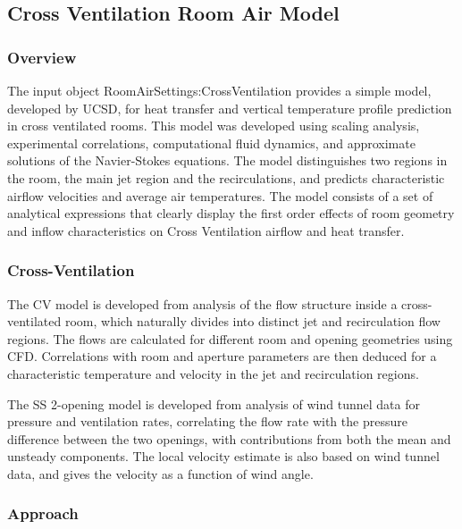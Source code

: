 \subsection{Cross Ventilation Room Air Model}\label{cross-ventilation-room-air-model}

\subsubsection{Overview}\label{overview-3-001}

The input object RoomAirSettings:CrossVentilation provides a simple model, developed by UCSD, for heat transfer and vertical temperature profile prediction in cross ventilated rooms. This model was developed using scaling analysis, experimental correlations, computational fluid dynamics, and approximate solutions of the Navier-Stokes equations. The model distinguishes two regions in the room, the main jet region and the recirculations, and predicts characteristic airflow velocities and average air temperatures. The model consists of a set of analytical expressions that clearly display the first order effects of room geometry and inflow characteristics on Cross Ventilation airflow and heat transfer.

\subsubsection{Cross-Ventilation}\label{cross-ventilation}

The CV model is developed from analysis of the flow structure inside a cross-ventilated room, which naturally divides into distinct jet and recirculation flow regions. The flows are calculated for different room and opening geometries using CFD. Correlations with room and aperture parameters are then deduced for a characteristic temperature and velocity in the jet and recirculation regions.

The SS 2-opening model is developed from analysis of wind tunnel data for pressure and ventilation rates, correlating the flow rate with the pressure difference between the two openings, with contributions from both the mean and unsteady components. The local velocity estimate is also based on wind tunnel data, and gives the velocity as a function of wind angle.

\subsubsection{Approach}\label{approach}

